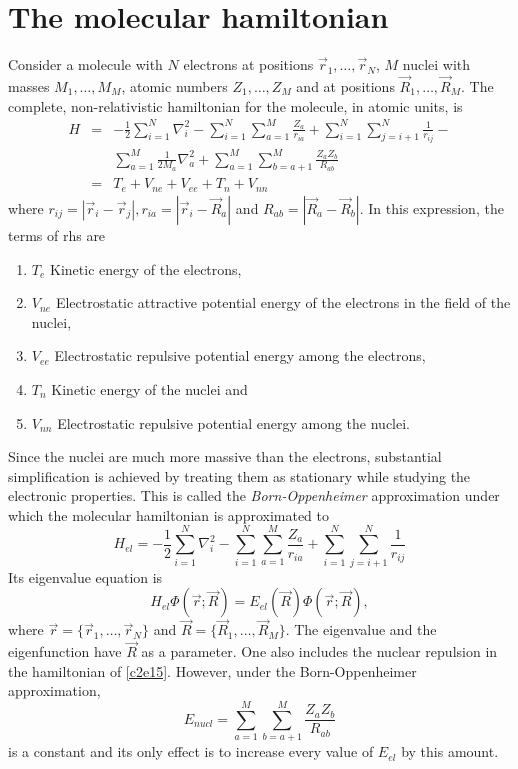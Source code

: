 \section{The molecular hamiltonian}\label{c2s2}
Consider a molecule with $N$ electrons at positions $\vec{r}_1, \ldots, 
\vec{r}_N$, $M$ nuclei with masses $M_1, \ldots, M_M$, atomic numbers $Z_1, 
\ldots, Z_M$ and at positions $\vec{R}_1, \ldots, \vec{R}_M$. The complete,
non-relativistic hamiltonian for the molecule, in atomic units, is
\begin{eqnarray}
H &=& -\frac{1}{2}\sum_{i=1}^N\nabla_i^2 - 
\sum_{i=1}^N\sum_{a=1}^M\frac{Z_a}{r_{ia}} + 
 \sum_{i=1}^N\sum_{j=i+1}^N\frac{1}{r_{ij}} -\nonumber \\
& & \sum_{a=1}^M\frac{1}{2M_a}\nabla_a^2 + 
 \sum_{a=1}^M\sum_{b=a+1}^M\frac{Z_aZ_b}{R_{ab}} \nonumber \\
 &=& T_{e} + V_{ne} + V_{ee} + T_{n} + V_{nn} \label{c2e14}
\end{eqnarray}
where $r_{ij} = |\vec{r}_i - \vec{r}_j|, r_{ia} = |\vec{r}_i - \vec{R}_a|$ and
$R_{ab} = |\vec{R}_a - \vec{R}_b|$. In this expression, the terms of rhs are
\begin{enumerate}
\item $T_e$ Kinetic energy of the electrons,
\item $V_{ne}$ Electrostatic attractive potential energy of the electrons in 
the field of the nuclei,
\item $V_{ee}$ Electrostatic repulsive potential energy among the electrons,
\item $T_n$ Kinetic energy of the nuclei and
\item $V_{nn}$ Electrostatic repulsive potential energy among the nuclei.
\end{enumerate}

Since the nuclei are much more massive than the electrons, substantial 
simplification is achieved by treating them as stationary while studying the 
electronic properties. This is called the \emph{Born-Oppenheimer} approximation
under which the molecular hamiltonian is approximated to 
\begin{equation}\label{c2e15}
H_{el} = -\frac{1}{2}\sum_{i=1}^N\nabla_i^2 - 
\sum_{i=1}^N\sum_{a=1}^M\frac{Z_a}{r_{ia}} +
\sum_{i=1}^N\sum_{j=i+1}^N\frac{1}{r_{ij}}
\end{equation}
Its eigenvalue equation is
\begin{equation}\label{c2e16}
H_{el}\Phi(\vec{r}; \vec{R}) = E_{el}(\vec{R})\Phi(\vec{r}; \vec{R}),
\end{equation}
where $\vec{r} = \{\vec{r}_1, \ldots, \vec{r}_N\}$ and $\vec{R} = \{\vec{R}_1,
\ldots, \vec{R}_M\}$. The eigenvalue and the eigenfunction have $\vec{R}$ as a
parameter. One also includes the nuclear repulsion in the hamiltonian of
\eqref{c2e15}. However, under the Born-Oppenheimer approximation,
\begin{equation}\label{c2e17}
E_{nucl} = \sum_{a=1}^M\sum_{b=a+1}^M\frac{Z_aZ_b}{R_{ab}}
\end{equation}
is a constant and its only effect is to increase every value of $E_{el}$ by
this amount.

